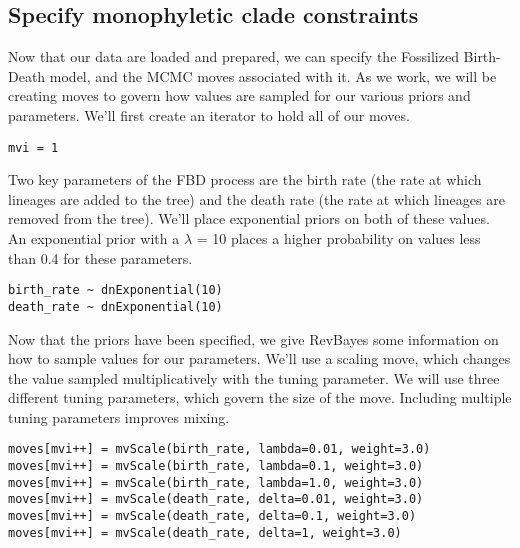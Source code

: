 \bigskip

\subsection{Specify monophyletic clade constraints}

Now that our data are loaded and prepared, we can specify the Fossilized Birth-Death model, and the MCMC moves associated with it. As we work, we will be creating moves to govern how values are sampled for our various priors and parameters. We'll first create an iterator to hold all of our moves.

{\tt \begin{snugshade*}
\begin{lstlisting}
mvi = 1
\end{lstlisting}
\end{snugshade*}}

Two key parameters of the FBD process are the birth rate (the rate at which lineages are added to the tree) and the death rate (the rate at which lineages are removed from the tree). We'll place exponential priors on both of these values. An exponential prior with a $\lambda$ =  10 places a higher probability on values less than 0.4 for these parameters. 

{\tt \begin{snugshade*}
\begin{lstlisting}
birth_rate ~ dnExponential(10)
death_rate ~ dnExponential(10)
\end{lstlisting}
\end{snugshade*}}

Now that the priors have been specified, we give RevBayes some information on how to sample values for our parameters. We'll use a scaling move, which changes the value sampled multiplicatively with the tuning parameter. We will use three different tuning parameters, which govern the size of the move. Including multiple tuning parameters improves mixing. 

{\tt \begin{snugshade*}
\begin{lstlisting}
moves[mvi++] = mvScale(birth_rate, lambda=0.01, weight=3.0)
moves[mvi++] = mvScale(birth_rate, lambda=0.1, weight=3.0)
moves[mvi++] = mvScale(birth_rate, lambda=1.0, weight=3.0)
moves[mvi++] = mvScale(death_rate, delta=0.01, weight=3.0)
moves[mvi++] = mvScale(death_rate, delta=0.1, weight=3.0)
moves[mvi++] = mvScale(death_rate, delta=1, weight=3.0)
\end{lstlisting}
\end{snugshade*}}

